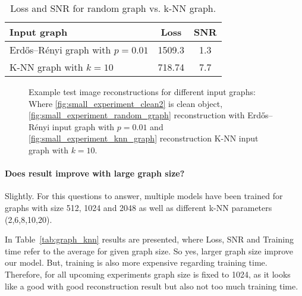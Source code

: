   \begin{table}[H]
    \centering
      \begin{tabular}{l|cc}
      \toprule
      \textbf{Input graph} & \textbf{Loss} & \textbf{SNR}  \\ 
      \midrule
      Erdős–Rényi graph with $p=0.01$    &  1509.3          &  1.3   \\ \hline
      K-NN graph with $k=10$       &  718.74          &  7.7    \\ \hline
      \midrule
      \end{tabular}
    \caption{Loss and SNR for random graph vs. k-NN graph. }
    \label{tab:input_graph}
  \end{table}
  
  \begin{figure}[H]
    \label{fig:input_graph_small}
    \hfill
    \hfill
    \hfill
    \hfill
	\caption{Example test image reconstructions for different input graphs:\\
  Where \ref{fig:small_experiment_clean2} is clean object, 
  \ref{fig:small_experiment_random_graph} reconstruction with  Erdős–Rényi input graph with $p=0.01$ and 
  \ref{fig:small_experiment_knn_graph} reconstruction K-NN input graph with $k=10$.
  }
\end{figure}


  \paragraph{Does result improve with large graph size?}
  Slightly.
  For this questions to answer, multiple models have been trained for graphs with size 512, 1024 and 2048 
  as well as different k-NN parameters (2,6,8,10,20).

  In Table~\ref{tab:graph_knn} results are presented, where Loss, SNR and Training time refer to 
  the average for given graph size. So yes, larger graph size improve our model. 
  But, training is also more expensive regarding training time. 
  Therefore, for all upcoming experiments graph size is fixed to 1024, as it looks like a good
  with good reconstruction result but also not too much training time.
  
